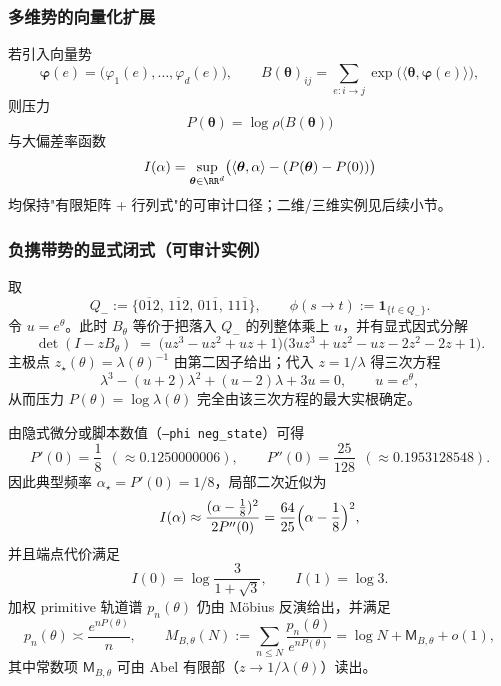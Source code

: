 \subsubsection{多维势的向量化扩展}\label{app:vector-potential}
若引入向量势
\[
\boldsymbol{\varphi}(e)=\bigl(\varphi_1(e),\dots,\varphi_d(e)\bigr),
\qquad
B(\boldsymbol{\theta})_{ij}=\sum_{e:i\to j}\exp\!\bigl(\langle\boldsymbol{\theta},\boldsymbol{\varphi}(e)\rangle\bigr),
\]
则压力
\[
P(\boldsymbol{\theta})=\log\rho\bigl(B(\boldsymbol{\theta})\bigr)
\]
与大偏差率函数
\[
I(\alpha)=\sup_{\boldsymbol{\theta}\in\RR^d}\bigl(\langle\boldsymbol{\theta},\alpha\rangle-(P(\boldsymbol{\theta})-P(0))\bigr)
\]
均保持"有限矩阵 + 行列式"的可审计口径；二维/三维实例见后续小节。

\subsubsection{负携带势的显式闭式（可审计实例）}
取
\[
Q_-:=\{0\overline{1}2,\,1\overline{1}2,\,01\overline{1},\,11\overline{1}\},
\qquad
\phi(s\to t):=\mathbf{1}_{\{t\in Q_-\}}.
\]
令 $u=e^\theta$。此时 $B_\theta$ 等价于把落入 $Q_-$ 的列整体乘上 $u$，并有显式因式分解
\[
\det(I-zB_\theta)
\;=\;
\bigl(u z^3-u z^2+u z+1\bigr)\bigl(3u z^3+u z^2-u z-2z^2-2z+1\bigr).
\]
主极点 $z_\star(\theta)=\lambda(\theta)^{-1}$ 由第二因子给出；代入 $z=1/\lambda$ 得三次方程
\[
\lambda^3-(u+2)\lambda^2+(u-2)\lambda+3u=0,\qquad u=e^\theta,
\]
从而压力 $P(\theta)=\log\lambda(\theta)$ 完全由该三次方程的最大实根确定。

由隐式微分或脚本数值（\texttt{--phi neg\_state}）可得
\[
P'(0)=\frac{1}{8}\ \ (\approx 0.1250000006),\qquad
P''(0)=\frac{25}{128}\ \ (\approx 0.1953128548).
\]
因此典型频率 $\alpha_\star=P'(0)=1/8$，局部二次近似为
\[
I(\alpha)\approx \frac{(\alpha-\frac18)^2}{2P''(0)}=\frac{64}{25}\Bigl(\alpha-\frac18\Bigr)^2,
\]
并且端点代价满足
\[
I(0)=\log\frac{3}{1+\sqrt3},\qquad I(1)=\log 3.
\]
加权 primitive 轨道谱 $p_n(\theta)$ 仍由 Möbius 反演给出，并满足
\[
p_n(\theta)\asymp \frac{e^{nP(\theta)}}{n},
\qquad
M_{B,\theta}(N):=\sum_{n\le N}\frac{p_n(\theta)}{e^{nP(\theta)}}=\log N+\mathsf{M}_{B,\theta}+o(1),
\]
其中常数项 $\mathsf{M}_{B,\theta}$ 可由 Abel 有限部（$z\to 1/\lambda(\theta)$）读出。

